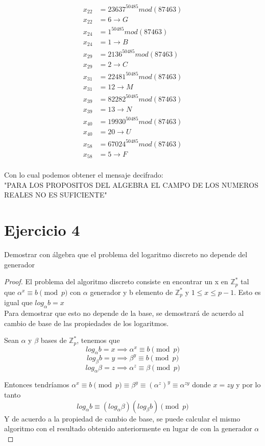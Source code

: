 \documentclass[12pt, letterpaper]{article}
\begin{document}
\begin{itemize}
\begin{equation*}
\begin{split}
x_{22}&=23637^{50485} mod (87463)\\x_{22}&=6\rightarrow G\\
x_{24}&=1^{50485} mod (87463)\\x_{24}&=1\rightarrow B\\
x_{29}&=2136^{50485} mod (87463)\\x_{29}&=2\rightarrow C\\
x_{31}&=22481^{50485} mod (87463)\\x_{31}&=12\rightarrow M\\
x_{39}&=82282^{50485} mod (87463)\\x_{39}&=13\rightarrow N\\
x_{40}&=19930^{50485} mod (87463)\\x_{40}&=20\rightarrow U\\
x_{58}&=67024^{50485} mod (87463)\\x_{58}&=5\rightarrow F\\
\end{split}
\end{equation*}

Con lo cual podemos obtener el mensaje decifrado:\\

"PARA LOS PROPOSITOS DEL ALGEBRA EL CAMPO DE LOS NUMEROS REALES NO ES SUFICIENTE"


\end{itemize}



\section*{Ejercicio 4}
Demostrar con álgebra que el problema del logaritmo discreto no depende del generador
\begin{proof}
El problema del algoritmo discreto consiste en encontrar un x en $\mathbb{Z}_p^*$ tal que $\alpha^x\equiv b \pmod{p}$ con $\alpha$ generador y b elemento de $\mathbb{Z}_p^*$ y $1\leq x \leq p-1$. Esto es igual que $log_{\alpha} b = x$
\\
Para demostrar que esto no depende de la base, se demostrará de acuerdo al cambio de base de las propiedades de los logaritmos.

Sean $\alpha$ y $\beta$  bases de $\mathbb{Z}_p^*$, tenemos que 
\[
log_{\alpha} b = x \implies  \alpha^x\equiv b \pmod{p}
\]
\[
log_{\beta} b = y \implies
\beta^y\equiv b \pmod{p}
\]
\[
log_{\alpha} \beta = z \implies \alpha^z\equiv \beta \pmod{p} 
\]

Entonces tendríamos $\alpha^x\equiv b \pmod{p} \equiv \beta^y \equiv (\alpha^z)^y \equiv \alpha^{zy}$ donde $x=zy$ y por lo tanto
\[
log_{\alpha} b\equiv \left(log_\alpha \beta\right) \left(log_\beta b\right) \pmod{ p}
\]
Y de acuerdo a la propiedad de cambio de base, se puede calcular el mismo algoritmo con el resultado obtenido anteriormente en lugar de con la generador $\alpha$
\end{proof}
\end{document}
